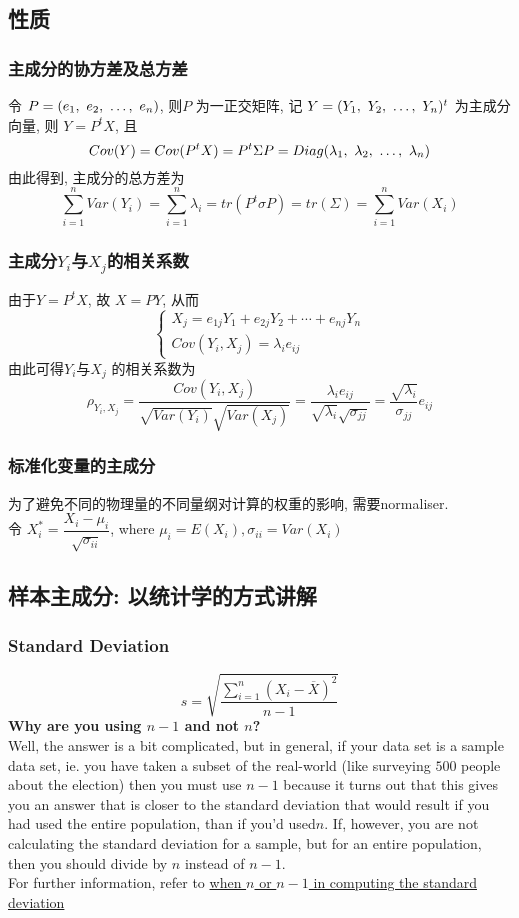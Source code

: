 \documentclass{article}
\begin{document}
\subsection{性质}
\subsubsection{主成分的协方差及总方差}
令 $P = (e_1,~e_2,~\ldots,~e_n)$, 则$P$ 为一正交矩阵, 记 $Y=(Y_1,~Y_2,~\ldots,~Y_n)^t$ 为主成分向量, 则 $Y=P^t X$, 且
$$
Cov(Y) = Cov(P^t X) = P^t \Sigma P = Diag (\lambda_1,~\lambda_2,~\ldots,~\lambda_n)
$$
由此得到, 主成分的总方差为
$$
\sum_{i=1}^n Var(Y_i) = \sum_{i=1}^n \lambda_i = tr(P^t \sigma P) = tr(\Sigma) = \sum_{i=1}^n Var(X_i)
$$

\subsubsection{主成分$Y_i$与$X_j$的相关系数}
由于$Y=P^t X$, 故 $X=PY$, 从而
$$
\left\{
  \begin{array}{l}
		  X_j = e_{1j}Y_1 + e_{2j}Y_2 + \cdots + e_{nj}Y_n \\
		  Cov(Y_i,X_j) = \lambda_i e_{ij}
  \end{array}
\right.
$$
由此可得$Y_i$与$X_j$ 的相关系数为
$$
\rho_{Y_i,X_j} = \frac{Cov(Y_i,X_j)}{\sqrt{Var(Y_i)} \sqrt{Var(X_j)}} = \frac{\lambda_i e_{ij}}{\sqrt{\lambda_i} \sqrt{\sigma_{jj}}} = \frac{\sqrt{\lambda_i}}{\sigma_{jj}} e_{ij}
$$

\subsubsection{标准化变量的主成分}
为了避免不同的物理量的不同量纲对计算的权重的影响, 需要normaliser.\\
令 $X_i^* = \dfrac{X_i - \mu_i}{\sqrt{\sigma_{ii}}}$, where $\mu_i = E(X_i), \sigma_{ii} = Var(X_i)$

\subsection{样本主成分: 以统计学的方式讲解}
\subsubsection{Standard Deviation}
$$
s = \sqrt{\dfrac{\sum_{i=1}^n (X_i - \overline{X})^2}{n-1}}
$$
\textbf{Why are you using $n-1$ and not $n$?}\\
Well, the answer is a bit complicated, but in general, if your data set is a sample data set,
ie. you have taken a subset of the real-world (like surveying $500$ people about the election) then you must use $n-1$
because it turns out that this gives you an answer that is closer to the standard deviation that would result if you had used the entire population, than if you'd used$n$.
If, however, you are not calculating the standard deviation for a sample, but for an entire population, then you should divide by $n$ instead of $n-1$.\\
For further information, refer to \href{http://mathcentral.uregina.ca/RR/database/RR.09.95/weston2.html}{when $n$ or $n-1$ in computing the standard deviation}
\end{document}
